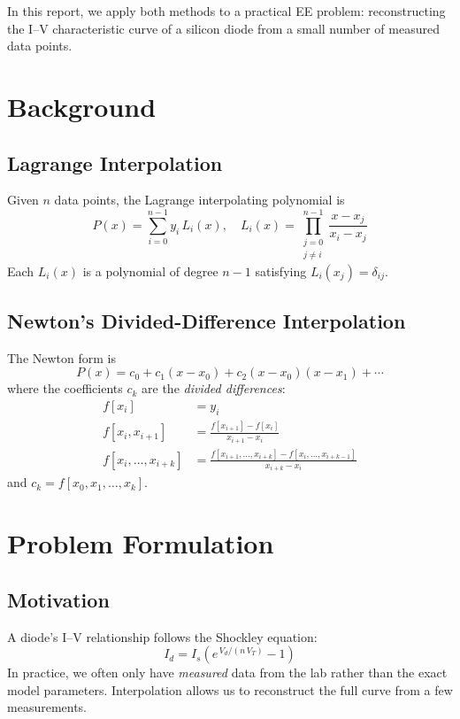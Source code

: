 \documentclass[letterpaper,twocolumn,fleqn]{article}
\begin{document}
In this report, we apply both methods to a practical EE problem: reconstructing
the I--V characteristic curve of a silicon diode from a small number of measured
data points.

\section{Background}

\subsection{Lagrange Interpolation}
Given $n$ data points, the Lagrange interpolating polynomial is
\begin{equation}
  P(x) = \sum_{i=0}^{n-1} y_i \, L_i(x), \quad
  L_i(x) = \prod_{\substack{j=0 \\ j \neq i}}^{n-1}
            \frac{x - x_j}{x_i - x_j}
  \label{eq:lagrange}
\end{equation}
Each $L_i(x)$ is a polynomial of degree $n-1$ satisfying $L_i(x_j) = \delta_{ij}$.

\subsection{Newton's Divided-Difference Interpolation}
The Newton form is
\begin{equation}
  P(x) = c_0 + c_1(x - x_0) + c_2(x - x_0)(x - x_1) + \cdots
  \label{eq:newton}
\end{equation}
where the coefficients $c_k$ are the \emph{divided differences}:
\begin{align}
  f[x_i] &= y_i \\
  f[x_i, x_{i+1}] &= \frac{f[x_{i+1}] - f[x_i]}{x_{i+1} - x_i} \\
  f[x_i, \ldots, x_{i+k}] &= \frac{f[x_{i+1}, \ldots, x_{i+k}]
                                   - f[x_i, \ldots, x_{i+k-1}]}
                                   {x_{i+k} - x_i}
\end{align}
and $c_k = f[x_0, x_1, \ldots, x_k]$.


\section{Problem Formulation}

\subsection{Motivation}
A diode's I--V relationship follows the Shockley equation:
\begin{equation}
  I_d = I_s \left( e^{\,V_d / (n\,V_T)} - 1 \right)
  \label{eq:shockley}
\end{equation}
In practice, we often only have \emph{measured} data from the lab rather than
the exact model parameters.  Interpolation allows us to reconstruct the full
curve from a few measurements.
\end{document}
